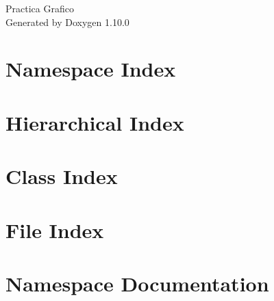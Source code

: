 \documentclass[twoside]{book}
\newcommand{\+}{\discretionary{\mbox{\scriptsize$\hookleftarrow$}}{}{}}
\newcommand{\clearemptydoublepage}{%
    \newpage{\pagestyle{empty}\cleardoublepage}%
  }
\begin{document}
  \raggedbottom
    \hypersetup{pageanchor=false,
                bookmarksnumbered=true,
                pdfencoding=unicode
               }
  \begin{titlepage}
  \vspace*{7cm}
  \begin{center}%
  {\Large Practica Grafico}\\
  \vspace*{1cm}
  {\large Generated by Doxygen 1.10.0}\\
  \end{center}
  \end{titlepage}
  \clearemptydoublepage
  \tableofcontents
  \clearemptydoublepage
  \hypersetup{pageanchor=true}
\chapter{Namespace Index}

\chapter{Hierarchical Index}

\chapter{Class Index}

\chapter{File Index}

\chapter{Namespace Documentation}



\end{document}
